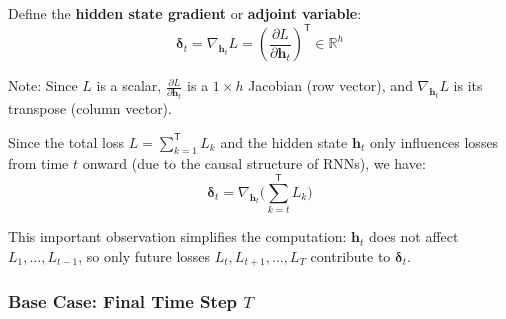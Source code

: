 \begin{notechapter}
Define the \textbf{hidden state gradient} or \textbf{adjoint variable}:
\[
\bm{\delta}_t = \nabla_{\mathbf{h}_t} L =
\left(\frac{\partial L}{\partial \mathbf{h}_t}\right)^\mathsf{T} \in \mathbb{R}^h
\]

Note: Since $L$ is a scalar, $\frac{\partial L}{\partial \mathbf{h}_t}$ is a
$1 \times h$ Jacobian (row vector), and $\nabla_{\mathbf{h}_t} L$ is its
transpose
(column vector).

Since the total loss $L = \sum_{k=1}^\mathsf{T} L_k$ and the hidden state $\mathbf{h}_t$
only influences losses from time $t$ onward (due to the causal structure of
RNNs),
we have:
\[
\bm{\delta}_t = \nabla_{\mathbf{h}_t} \Bigg( \sum_{k=t}^\mathsf{T} L_k \Bigg)
\tag{*}
\]

This important observation simplifies the computation:
$\mathbf{h}_t$ does not affect $L_1, \dots, L_{t-1}$, so only future losses
$L_t, L_{t+1}, \dots, L_T$ contribute to $\bm{\delta}_t$.

\subsubsection{Base Case: Final Time Step $T$}

\begin{figure}[h]
    \centering
\end{figure}
\end{notechapter}
